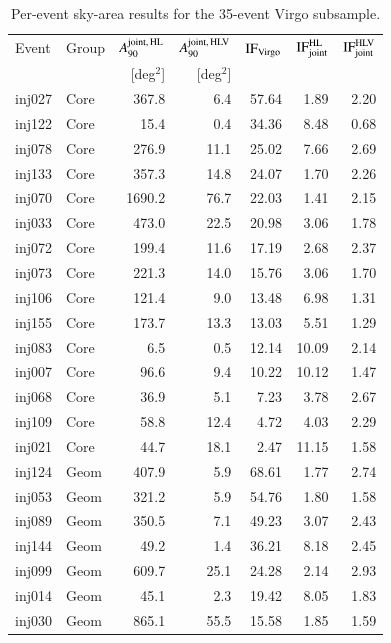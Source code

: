 \documentclass{aa}
\begin{document}
\begin{appendix}
\begin{table}[ht!]
\centering
\caption{Per-event sky-area results for the 35-event Virgo subsample.}
\label{tab:virgo_35events}
\begin{tabular}{llrrrrr}
\hline\hline
Event & Group & $A_{90}^{\rm joint,\,HL}$ & $A_{90}^{\rm joint,\,HLV}$ &
$\mathrm{IF}_{\rm Virgo}$ & $\mathrm{IF}_{\rm joint}^{\rm HL}$ &
$\mathrm{IF}_{\rm joint}^{\rm HLV}$ \\
 & & [deg$^2$] & [deg$^2$] & & & \\
\hline
inj027 & Core & 367.8 & 6.4 & 57.64 & 1.89 & 2.20 \\
inj122 & Core & 15.4 & 0.4 & 34.36 & 8.48 & 0.68 \\
inj078 & Core & 276.9 & 11.1 & 25.02 & 7.66 & 2.69 \\
inj133 & Core & 357.3 & 14.8 & 24.07 & 1.70 & 2.26 \\
inj070 & Core & 1690.2 & 76.7 & 22.03 & 1.41 & 2.15 \\
inj033 & Core & 473.0 & 22.5 & 20.98 & 3.06 & 1.78 \\
inj072 & Core & 199.4 & 11.6 & 17.19 & 2.68 & 2.37 \\
inj073 & Core & 221.3 & 14.0 & 15.76 & 3.06 & 1.70 \\
inj106 & Core & 121.4 & 9.0 & 13.48 & 6.98 & 1.31 \\
inj155 & Core & 173.7 & 13.3 & 13.03 & 5.51 & 1.29 \\
inj083 & Core & 6.5 & 0.5 & 12.14 & 10.09 & 2.14 \\
inj007 & Core & 96.6 & 9.4 & 10.22 & 10.12 & 1.47 \\
inj068 & Core & 36.9 & 5.1 & 7.23 & 3.78 & 2.67 \\
inj109 & Core & 58.8 & 12.4 & 4.72 & 4.03 & 2.29 \\
inj021 & Core & 44.7 & 18.1 & 2.47 & 11.15 & 1.58 \\
\noalign{\smallskip}
inj124 & Geom & 407.9 & 5.9 & 68.61 & 1.77 & 2.74 \\
inj053 & Geom & 321.2 & 5.9 & 54.76 & 1.80 & 1.58 \\
inj089 & Geom & 350.5 & 7.1 & 49.23 & 3.07 & 2.43 \\
inj144 & Geom & 49.2 & 1.4 & 36.21 & 8.18 & 2.45 \\
inj099 & Geom & 609.7 & 25.1 & 24.28 & 2.14 & 2.93 \\
inj014 & Geom & 45.1 & 2.3 & 19.42 & 8.05 & 1.83 \\
inj030 & Geom & 865.1 & 55.5 & 15.58 & 1.85 & 1.59 \\

\end{tabular}
\end{table}
\end{appendix}
\end{document}
